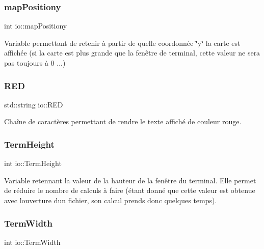 \subsubsection{\texorpdfstring{map\+Positiony}{mapPositiony}}
{\footnotesize\ttfamily int io\+::map\+Positiony}



Variable permettant de retenir à partir de quelle coordonnée \char`\"{}y\char`\"{} la carte est affichée (si la carte est plus grande que la fenêtre de terminal, cette valeur ne sera pas toujours à 0 ...) 

\mbox{\label{namespaceio_ac9181eea4e6d57e5481bc7e5822de4cb}} 
\subsubsection{\texorpdfstring{R\+ED}{RED}}
{\footnotesize\ttfamily std\+::string io\+::\+R\+ED}



Chaîne de caractères permettant de rendre le texte affiché de couleur rouge. 

\mbox{\label{namespaceio_afaeef00a45e14dc7227025fa7fd27240}} 
\subsubsection{\texorpdfstring{Term\+Height}{TermHeight}}
{\footnotesize\ttfamily int io\+::\+Term\+Height}



Variable retennant la valeur de la hauteur de la fenêtre du terminal. Elle permet de réduire le nombre de calculs à faire (étant donné que cette valeur est obtenue avec l\textquotesingle{}ouverture d\textquotesingle{}un fichier, son calcul prends donc quelques temps). 

\mbox{\label{namespaceio_a09b19ec88fb58a6086ca54be52b7bc08}} 
\subsubsection{\texorpdfstring{Term\+Width}{TermWidth}}
{\footnotesize\ttfamily int io\+::\+Term\+Width}



